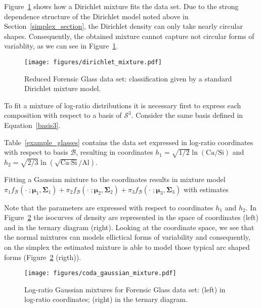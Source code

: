 \documentclass[12pt, a4paper]{article}
\newcommand{\m}[1]{\boldsymbol{#1}}
\begin{document}
Figure~\ref{fig06fittingdirichlet} shows how a Dirichlet mixture fits the data set. Due to the strong dependence structure of the Dirichlet model noted above in Section~\ref{simplex_section}, the Dirichlet density can only take nearly circular shapes. Consequently, the obtained mixture cannot capture not circular forms of variablity, as we can see in Figure~\ref{fig06fittingdirichlet}.

\begin{figure}[htbp]
\centering
\texttt{[image: figures/dirichlet\_mixture.pdf]}
\caption{Reduced Forensic Glass data set: classification given by a standard Dirichlet mixture model.}
\label{fig06fittingdirichlet}
\end{figure}

To fit a mixture of log-ratio distributions it is necessary first to express each composition with respect to a basis of $\mathcal{S}^3$. Consider the same basis defined in Equation~\ref{basis3}.

Table~\ref{example_glasses} contains the data set expressed in log-ratio coordinates with respect to basis $\mathcal{B}$, resulting in coordinates $h_1 = \sqrt{1/2} \ln(\text{Ca}/\text{Si})$ and $h_2 = \sqrt{2/3} \ln(\sqrt{\text{Ca} \cdot \text{Si}} / \text{Al})$.



Fitting a Gaussian mixture to the coordinates results in mixture model
$
\pi_1 f_{\mathcal{B}}(\cdot\;; \m\mu_1, \m\Sigma_1) + \pi_2 f_{\mathcal{B}}(\cdot\;; \m\mu_2, \m\Sigma_2) + \pi_3 f_{\mathcal{B}}(\cdot\;; \m\mu_3, \m\Sigma_3)
$
with estimates

{\small  }

Note that the parameters are expressed with respect to coordinates $h_1$ and $h_2$. In Figure~\ref{fig07fittingcodaGaussian} the isocurves of density are represented in the space
of coordinates (left) and in the ternary diagram (right). Looking at the coordinate space, we see that the normal mixtures can models ellictical forms of variability and consequently, on the simplex the estimated mixture is able to model those typical arc shaped forms (Figure~\ref{fig07fittingcodaGaussian} (rigth)).

\begin{figure}[htbp]
\centering
\texttt{[image: figures/coda\_gaussian\_mixture.pdf]}\\
\caption{Log-ratio Gaussian mixtures for Forensic Glass data set: (left) in log-ratio coordinates; (right) in the ternary diagram.}
\label{fig07fittingcodaGaussian}
\end{figure}
\end{document}
